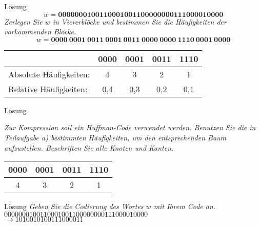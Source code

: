 \begin{frame}{Lösung}
	$$w = \mathbf{0000000100110001001100000000111000010000}$$
	\textit{Zerlegen Sie $w$ in Viererblöcke und bestimmen Sie die Häufigkeiten der vorkommenden Blöcke.} \\[1em]
	\pause
	$$w = \mathbf{0000 \ 0001 \ 0011 \ 0001 \ 0011 \ 0000 \ 0000 \ 1110 \ 0001 \ 0000}$$ \pause
	\begin{table}[h!]
		\centering
		\begin{tabular}{l|cccc}	
			& 0000 & 0001 & 0011 & 1110 \\ \hline
			Absolute Häufigkeiten: & 4 & 3 & 2 & 1 \\
			Relative Häufigkeiten:  & 0,4 & 0,3 & 0,2 & 0,1\\
		\end{tabular}
	\end{table}
\end{frame}

\begin{frame}{Lösung}
	\vspace*{1em}
	\begin{minipage}{0.45\linewidth}
		\textit{Zur Kompression soll ein Huffman-Code verwendet werden. Benutzen Sie die in Teilaufgabe a) bestimmten Häufigkeiten, um den entsprechenden Baum aufzustellen. Beschriften Sie alle Knoten und Kanten.}
		\pause 
		\begin{table}[h!]
			\centering
			\begin{tabular}{cccc}	
				0000 & 0001 & 0011 & 1110 \\ \hline
				4 & 3 & 2 & 1 \\	
			\end{tabular}
		\end{table}
	\end{minipage}
	\hfill
	\begin{minipage}{0.5\linewidth}
		\begin{figure}[h!]
			\centering
		\end{figure}
	\end{minipage}
\end{frame}

\begin{frame}{Lösung}
	\textit{Geben Sie die Codierung des Wortes $w$ mit Ihrem Code an.} \\[2em] \pause
	$0000000100110001001100000000111000010000$ \\ \hfill $\to 1010010100111000011$
\end{frame}

